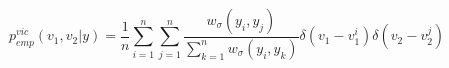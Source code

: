 \documentclass[runningheads]{llncs}
\begin{document}



    


\begin{equation}
    p_{emp}^{vic}(v_1, v_2 | y) = \frac{1}{n}\sum_{i=1}^n\sum_{j=1}^n \frac{w_\sigma(y_i, y_j)}{\sum_{k=1}^n w_\sigma(y_i, y_k)} \delta(v_1 - v_1^i) \delta(v_2 - v_2^j)
    \label{approx_pos_distribution}
\end{equation}
\end{document}
